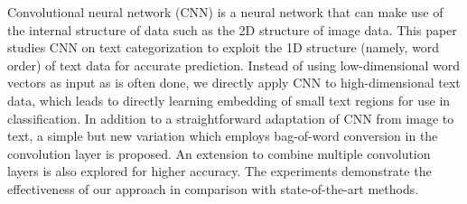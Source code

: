Convolutional neural network (CNN) is a neural network that can make use of the internal structure of data such as the 2D structure of image data.  This paper studies CNN on text categorization to exploit the 1D structure (namely, word order) of text data for accurate prediction.  Instead of using low-dimensional word vectors as input as is often done, we directly apply CNN to high-dimensional text data, which leads to directly learning embedding of small text regions for use in classification.  In addition to a straightforward adaptation of CNN from image to text, a simple but new variation which employs bag-of-word conversion in the convolution layer is proposed.  An extension to combine multiple convolution layers is also explored for higher accuracy.  The experiments demonstrate the effectiveness of our approach in comparison with state-of-the-art methods.
